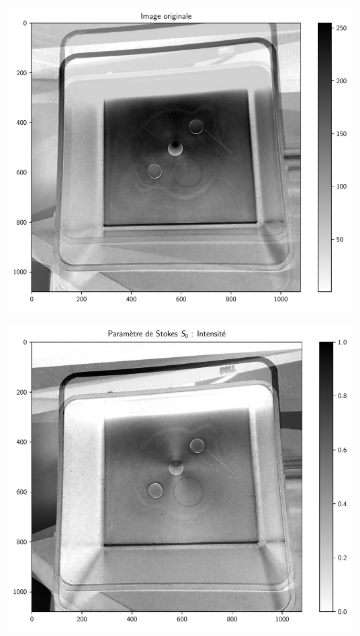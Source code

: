 \begin{figure}[tbph]
	\centering
	\begin{subfigure}[l]{0.495\textwidth}
		\includegraphics[width=\textwidth]{../Chap2/Figures/imgOriginal.pdf}
	\end{subfigure}
	\begin{subfigure}[r]{0.495\textwidth}
		\includegraphics[width=\textwidth]{../Chap2/Figures/img_stokesI.pdf}

\end{subfigure}
\end{figure}
